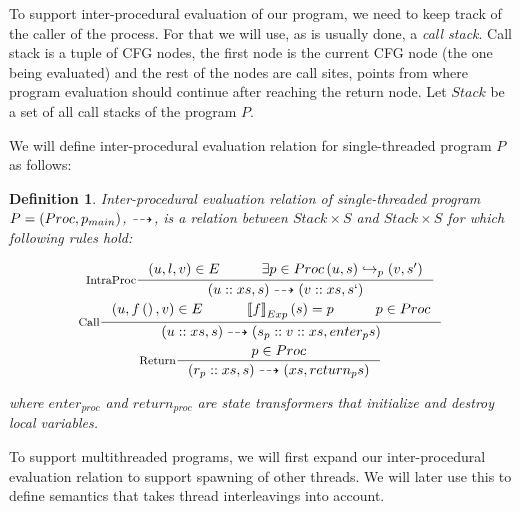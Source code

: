 \documentclass[..thesis.tex]{subfiles}
\newtheorem{defin}{Definition}[section]
\begin{document}
To support inter-procedural evaluation of our program, we need to keep track of the caller of the process. For that we will use, as is usually done, a \textit{call stack}.
Call stack is a tuple of CFG nodes, the first node is the current CFG node (the one being evaluated) and the rest of the nodes are call sites, points from where program evaluation
 should continue after reaching the return node. Let $Stack$ be a set of all call stacks of the program $P$. 

We will define inter-procedural evaluation relation for single-threaded program $P$ as follows:

\begin{defin}

Inter-procedural evaluation relation of single-threaded program $P = \left( Proc,p_{ main} \right) $, 
$\dashrightarrow$, is a relation between $Stack \times S$ and $Stack \times S$ for which following rules hold:

\addtolength{\jot}{2em}
\begin{gather*}
  \inference[IntraProc]{\lp u, l, v \rp \in E  \separ \exists p \in Proc  \lp u, s \rp \intraproc_p \lp v, s' \rp }{ \lp u :: xs, s \rp \interproc \lp v :: xs, s` \rp} \\
  \inference[Call]{ \lp u, f\lp\rp , v \rp  \in E \separ  \lllb f \rrrb_{Exp} \lp s \rp = p \separ p \in Proc }{\lp u :: xs , s \rp \interproc \lp s_{p} :: v :: xs, enter_{p} s \rp} \\
  \inference[Return] { p \in Proc} { \lp r_{p}::xs , s \rp \interproc \lp xs, return_{p} s \rp}
\end{gather*}
\addtolength{\jot}{-2em}

where $enter_{proc}$ and $return_{proc}$ are state transformers that initialize and destroy local variables.
\end{defin}


To support multithreaded programs, we will first expand our inter-procedural evaluation relation to support spawning of other threads. We will later use this to define semantics that takes thread interleavings into account.
\end{document}

